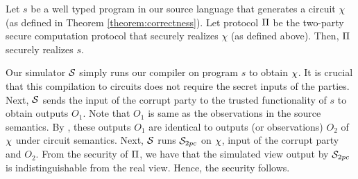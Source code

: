 \begin{theorem}[Security]\label{theorem:security}
Let $s$ be a well typed program in our source language
that generates a circuit
$\chi$ (as defined in Theorem \ref{theorem:correctness}). Let protocol
$\Pi$ be the two-party secure computation protocol that securely
realizes $\chi$ (as defined above). Then, $\Pi$ securely realizes
$s$.
\end{theorem}

Our simulator $\mathcal{S}$ simply runs our compiler on program $s$ to obtain $\chi$. It is crucial that this compilation to circuits does not require the secret inputs of the parties. Next, $\mathcal{S}$ sends the input of the corrupt party to the trusted functionality of $s$ to obtain outputs $O_1$. Note that $O_1$ is same as the observations in the source semantics. 
By , these outputs $O_1$ are identical to outputs (or observations) $O_2$ of $\chi$ under circuit semantics. 
Next, $\mathcal{S}$ runs $\mathcal{S}_{\tiny{2pc}}$ on $\chi$, input of the corrupt party and $O_2$.
From the security of $\Pi$, we have that the simulated view output by $\mathcal{S}_{\tiny{2pc}}$ is indistinguishable from the real view. Hence, the security follows.
 
